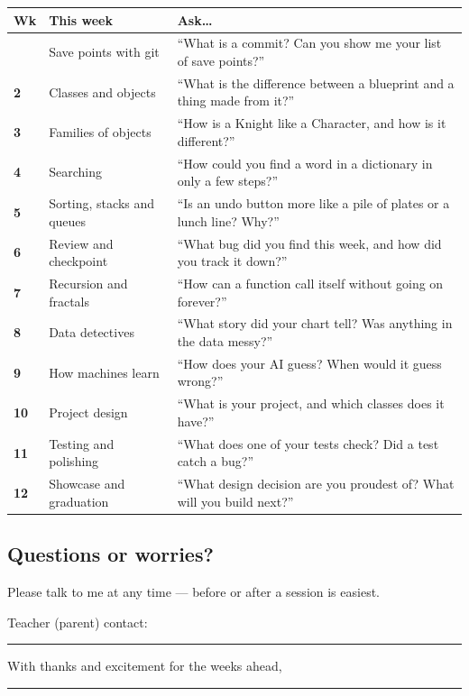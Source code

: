 \documentclass[level=3]{kidscode}
\begin{document}
\renewcommand{\arraystretch}{1.45}
\begin{longtable}{@{}>{\bfseries}p{0.8cm}>{\raggedright\arraybackslash}p{4.4cm}p{\dimexpr\linewidth-5.2cm-4\tabcolsep}@{}}
\toprule
\rowcolor{kcaccent!15} Wk & This week & Ask\ldots\\ \midrule\endhead
\bottomrule\endfoot
1 & Save points with git & \enquote{What is a commit? Can you show me your list of save points?}\\ \midrule
2 & Classes and objects & \enquote{What is the difference between a blueprint and a thing made from it?}\\ \midrule
3 & Families of objects & \enquote{How is a Knight like a Character, and how is it different?}\\ \midrule
4 & Searching & \enquote{How could you find a word in a dictionary in only a few steps?}\\ \midrule
5 & Sorting, stacks and queues & \enquote{Is an undo button more like a pile of plates or a lunch line? Why?}\\ \midrule
6 & Review and checkpoint & \enquote{What bug did you find this week, and how did you track it down?}\\ \midrule
7 & Recursion and fractals & \enquote{How can a function call itself without going on forever?}\\ \midrule
8 & Data detectives & \enquote{What story did your chart tell? Was anything in the data messy?}\\ \midrule
9 & How machines learn & \enquote{How does your AI guess? When would it guess wrong?}\\ \midrule
10 & Project design & \enquote{What is your project, and which classes does it have?}\\ \midrule
11 & Testing and polishing & \enquote{What does one of your tests check? Did a test catch a bug?}\\ \midrule
12 & Showcase and graduation & \enquote{What design decision are you proudest of? What will you build next?}\\
\end{longtable}

\subsection{Questions or worries?}
Please talk to me at any time --- before or after a session is easiest.

\medskip
Teacher (parent) contact: \rule{8cm}{0.4pt}

\medskip
With thanks and excitement for the weeks ahead,

\medskip
\rule{6cm}{0.4pt}
\end{document}
